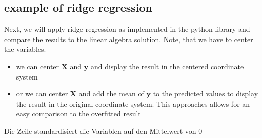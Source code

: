 \documentclass[letterpaper,10pt,english]{jupyterBook}
\begin{document}
\subsection{example of ridge regression}
\label{\detokenize{Regression_Techniques:example-of-ridge-regression}}
\sphinxAtStartPar
Next, we will apply ridge regression as implemented in the python  library and compare the results to the linear algebra solution. Note, that we have to center the variables.
\begin{itemize}
\item {} 
\sphinxAtStartPar
we can center \(\mathbf{X}\) and \(\mathbf{y}\) and display the result in the centered coordinate system

\item {} 
\sphinxAtStartPar
or we can center \(\mathbf{X}\) and add the mean of \(\mathbf{y}\) to the predicted values to display the result in the original coordinate system. This approaches allows for an easy comparison to the overfitted result

\end{itemize}

\sphinxAtStartPar
Die Zeile  standardisiert die Variablen auf den Mittelwert von 0
\end{document}
